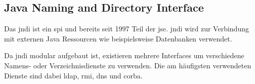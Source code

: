 
\subsection{Java Naming and Directory Interface}\label{subsec:jndi}
Das \gls{jndi} ist ein \gls{spi} und bereits seit 1997 Teil der \gls{jse}.
\gls{jndi} wird zur Verbindung mit externen Java Ressourcen wie beispielsweise Datenbanken verwendet.

Da \gls{jndi} modular aufgebaut ist, existieren mehrere Interfaces um verschiedene Namens- oder Verzeichnisdienste zu verwenden.
Die am häufigsten verwendeten Dienste sind dabei \gls{ldap}, \gls{rmi}, \gls{dns} und \gls{corba}.
